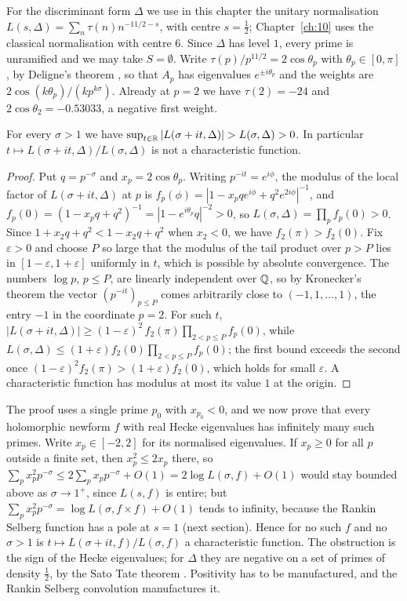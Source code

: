 For the discriminant form $\Delta$ we use in this chapter the unitary normalisation $L(s,\Delta) = \sum_n\tau(n)n^{-11/2-s}$, with centre $s=\frac12$; Chapter~\ref{ch:10} uses the classical normalisation with centre $6$. Since $\Delta$ has level $1$, every prime is unramified and we may take $S=\emptyset$. Write $\tau(p)/p^{11/2} = 2\cos\theta_p$ with $\theta_p\in[0,\pi]$, by Deligne's theorem \cite{deligne1974}, so that $A_p$ has eigenvalues $e^{\pm i\theta_p}$ and the weights are $2\cos(k\theta_p)/(k p^{k\sigma})$. Already at $p=2$ we have $\tau(2) = -24$ and $2\cos\theta_2 = -0.53033$, a negative first weight.

\begin{proposition}\label{prop:ch09notcf}
For every $\sigma>1$ we have $\sup_{t\in\mathbb{R}} |L(\sigma+it,\Delta)| > L(\sigma,\Delta) > 0$. In particular $t\mapsto L(\sigma+it,\Delta)/L(\sigma,\Delta)$ is not a characteristic function.
\end{proposition}

\begin{proof}
Put $q = p^{-\sigma}$ and $x_p = 2\cos\theta_p$. Writing $p^{-it} = e^{i\phi}$, the modulus of the local factor of $L(\sigma+it,\Delta)$ at $p$ is $f_p(\phi) = |1 - x_p q e^{i\phi} + q^2 e^{2i\phi}|^{-1}$, and $f_p(0) = (1 - x_p q + q^2)^{-1} = |1-e^{i\theta_p}q|^{-2} > 0$, so $L(\sigma,\Delta) = \prod_p f_p(0) > 0$. Since $1 + x_2 q + q^2 < 1 - x_2 q + q^2$ when $x_2 < 0$, we have $f_2(\pi) > f_2(0)$. Fix $\varepsilon>0$ and choose $P$ so large that the modulus of the tail product over $p>P$ lies in $[1-\varepsilon,1+\varepsilon]$ uniformly in $t$, which is possible by absolute convergence. The numbers $\log p$, $p\le P$, are linearly independent over $\mathbb{Q}$, so by Kronecker's theorem the vector $(p^{-it})_{p\le P}$ comes arbitrarily close to $(-1,1,\dots,1)$, the entry $-1$ in the coordinate $p=2$. For such $t$, $|L(\sigma+it,\Delta)| \ge (1-\varepsilon)^2\, f_2(\pi)\prod_{2<p\le P} f_p(0)$, while $L(\sigma,\Delta)\le(1+\varepsilon)f_2(0)\prod_{2<p\le P}f_p(0)$; the first bound exceeds the second once $(1-\varepsilon)^2f_2(\pi)>(1+\varepsilon)f_2(0)$, which holds for small $\varepsilon$. A characteristic function has modulus at most its value $1$ at the origin.
\end{proof}

The proof uses a single prime $p_0$ with $x_{p_0}<0$, and we now prove that every holomorphic newform $f$ with real Hecke eigenvalues has infinitely many such primes. Write $x_p\in[-2,2]$ for its normalised eigenvalues. If $x_p\ge0$ for all $p$ outside a finite set, then $x_p^2\le2x_p$ there, so $\sum_px_p^2p^{-\sigma}\le2\sum_px_pp^{-\sigma}+O(1) = 2\log L(\sigma,f)+O(1)$ would stay bounded above as $\sigma\to1^+$, since $L(s,f)$ is entire; but $\sum_px_p^2p^{-\sigma} = \log L(\sigma,f\times f)+O(1)$ tends to infinity, because the Rankin Selberg function has a pole at $s=1$ (next section). Hence for no such $f$ and no $\sigma>1$ is $t\mapsto L(\sigma+it,f)/L(\sigma,f)$ a characteristic function. The obstruction is the sign of the Hecke eigenvalues; for $\Delta$ they are negative on a set of primes of density $\frac12$, by the Sato Tate theorem \cite{blght2011}. Positivity has to be manufactured, and the Rankin Selberg convolution manufactures it.


